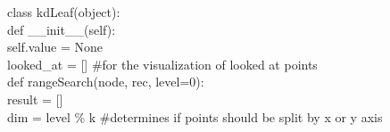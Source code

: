 \documentclass[english, fontsize=12pt, paper=a4, twoside=false, draft=true, pagesize=auto, version=last, DIV=16]{scrartcl}
\theoremstyle{break}
\begin{document}
class kdLeaf(object):\\
\hspace*{10mm}def \_\_init\_\_(self):\\
\hspace*{10mm}\hspace*{10mm}self.value = None\\

looked\_at = [] \#for the visualization of looked at points\\
def rangeSearch(node, rec, level=0):\\
\hspace*{10mm}result = []\\
\hspace*{10mm}dim = level \% k \#determines if points should be split by x or y axis\\
    
\end{document}
